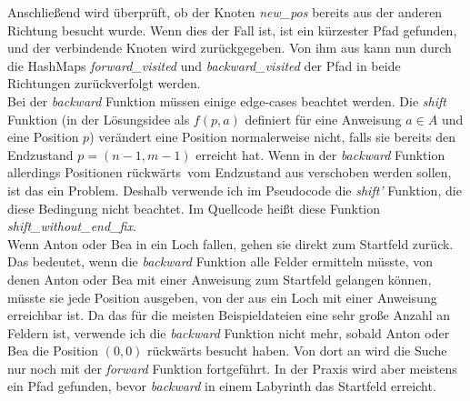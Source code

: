 \documentclass[a4paper,10pt,ngerman]{scrartcl}
\begin{document}
    Anschließend wird überprüft, ob der Knoten \textit{new\_pos} bereits aus der anderen Richtung besucht wurde. Wenn dies der Fall ist, ist ein kürzester Pfad gefunden, und der verbindende Knoten wird zurückgegeben. Von ihm aus kann nun durch die HashMaps \textit{forward\_visited} und \textit{backward\_visited} der Pfad in beide Richtungen zurückverfolgt werden. \\
    Bei der \textit{backward} Funktion müssen einige edge-cases beachtet werden. Die \textit{shift} Funktion (in der Lösungsidee als $f(p,a)$ definiert für eine Anweisung $a \in A$ und eine Position $p$) verändert eine Position normalerweise nicht, falls sie bereits den Endzustand $p = (n-1, m-1)$ erreicht hat. Wenn in der \textit{backward} Funktion allerdings Positionen \glqq rückwärts\grqq~vom Endzustand aus verschoben werden sollen, ist das ein Problem. 
    Deshalb verwende ich im Pseudocode die \textit{shift'} Funktion, die diese Bedingung nicht beachtet. Im Quellcode heißt diese Funktion \textit{shift\_without\_end\_fix}. \\
    Wenn Anton oder Bea in ein Loch fallen, gehen sie direkt zum Startfeld zurück. Das bedeutet, wenn die \textit{backward} Funktion alle Felder ermitteln müsste, von denen Anton oder Bea mit einer Anweisung zum Startfeld gelangen können, müsste sie jede Position ausgeben, von der aus ein Loch mit einer Anweisung erreichbar ist. Da das für die meisten Beispieldateien eine sehr große Anzahl an Feldern ist, verwende ich die \textit{backward} Funktion nicht mehr, sobald Anton oder Bea die Position $(0,0)$ rückwärts besucht haben. Von dort an wird die Suche nur noch mit der \textit{forward} Funktion fortgeführt. In der Praxis wird aber meistens ein Pfad gefunden, bevor \textit{backward} in einem Labyrinth das Startfeld erreicht.
\end{document}

